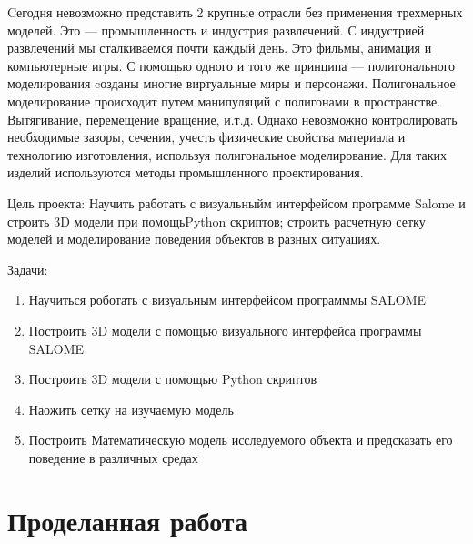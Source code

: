 \documentclass[a4paper,12pt]{article}
\theoremstyle{plain} %
\theoremstyle{definition} %
\theoremstyle{remark} %
\begin{document}
	Cегодня невозможно представить 2 крупные отрасли без применения трехмерных моделей. Это — промышленность и индустрия развлечений.
	С индустрией развлечений мы сталкиваемся почти каждый день. Это фильмы, анимация и компьютерные игры. С помощью одного и того же принципа — полигонального моделирования cозданы многие виртуальные миры и персонажи. Полигональное моделирование происходит путем манипуляций с полигонами в пространстве. Вытягивание, перемещение вращение,  и.т.д. Однако невозможно контролировать необходимые зазоры, сечения, учесть физические свойства материала и технологию изготовления, используя полигональное моделирование. Для таких изделий используются методы промышленного проектирования.

	Цель проекта: Научить работать с визуальныйм интерфейсом программе Salome и строить 3D модели при помощьPython скриптов; строить расчетную сетку моделей и моделирование поведения объектов в разных ситуациях.

	Задачи: 
	\begin{enumerate}
	\item Научиться роботать с визуальным интерфейсом программмы SALOME
	\item Построить 3D модели с помощью визуального интерфейса программы SALOME
	\item Построить 3D модели с помощью Python скриптов
	\item Наожить сетку на изучаемую модель
	\item Построить Математическую модель исследуемого объекта и предсказать его поведение в различных средах
	\end{enumerate}
	
	\newpage
	\section{Проделанная работа}
	
\end{document}
